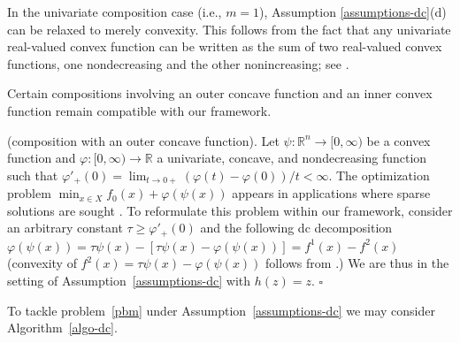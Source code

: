 \documentclass[smallextended,envcountsect]{svjour3}
\renewcommand{\Re}{\mathbb{R}}
\newcommand{\mybox}{{\hfill $\square$}}
\begin{document}
In the univariate composition case (i.e., $m=1$), Assumption \ref{assumptions-dc}(d) can be relaxed to merely convexity. This follows from the fact that any univariate real-valued convex function can be written as the sum of two real-valued convex functions, one nondecreasing and the other nonincreasing; see \cite[Lemma 6.1.1]{Cui_Pang_2022}.
%

Certain compositions involving an outer concave function and an inner convex function remain compatible with our framework.
\begin{example}{ \rm (composition with an outer concave function).}
Let $\psi:\Re^n \to [0,\infty)$ be a convex function and $\varphi:[0,\infty)\to \Re$ a univariate, concave, and nondecreasing function such that $\varphi'_+(0)=\lim_{t \to 0+}(\varphi(t)-\varphi(0))/t < \infty$. The optimization problem $\min_{x \in X} f_0(x)+\varphi(\psi(x))$ 
 appears in applications where sparse
solutions are sought \cite{Oliveira_Tcheou_2019}. To reformulate this problem within our framework, consider an arbitrary constant $\tau \geq \varphi'_+(0)$ and the following dc decomposition $\varphi(\psi(x))= \tau \psi(x)-[\tau\psi(x)-\varphi(\psi(x))]=f^1(x)-f^2(x)$ (convexity of $f^2(x)=\tau\psi(x)-\varphi(\psi(x))$  follows from \cite[Proposition 4.11]{WWBook}.) We are thus in the setting of Assumption~\ref{assumptions-dc} with $h(z)=z$. \mybox
\end{example}
To tackle problem~\eqref{pbm} under Assumption~\ref{assumptions-dc} we may consider  Algorithm~\ref{algo-dc}.
\end{document}
